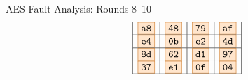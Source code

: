 \documentclass{beamer}
\newenvironment{tres important}[2][]{
	\setkeys{EmphEqEnv}{#2}
	\setkeys{EmphEqOpt}{box={\setlength{\fboxsep}{10pt}\fcolorbox{myNewColorA}{white}},#1}
	\EmphEqMainEnv}
{\endEmphEqMainEnv}
\begin{document}
\begin{frame}[fragile]{AES Fault Analysis: Rounds 8–10}
\[\begin{array}{ccc}
    &

\begin{array}{|c|c|c|c|}
    \hline
    \fcolorbox{orange!80!black}{orange!20}{\texttt{a8}} & \fcolorbox{orange!80!black}{orange!20}{\texttt{48}} & \fcolorbox{orange!80!black}{orange!20}{\texttt{79}} & \fcolorbox{orange!80!black}{orange!20}{\texttt{af}} \\
    \hline
    \fcolorbox{orange!80!black}{orange!20}{\texttt{e4}} & \fcolorbox{orange!80!black}{orange!20}{\texttt{0b}} & \fcolorbox{orange!80!black}{orange!20}{\texttt{e2}} & \fcolorbox{orange!80!black}{orange!20}{\texttt{4d}} \\
    \hline
    \fcolorbox{orange!80!black}{orange!20}{\texttt{8d}} & \fcolorbox{orange!80!black}{orange!20}{\texttt{62}} & \fcolorbox{orange!80!black}{orange!20}{\texttt{d1}} & \fcolorbox{orange!80!black}{orange!20}{\texttt{97}} \\
    \hline
    \fcolorbox{orange!80!black}{orange!20}{\texttt{37}} & \fcolorbox{orange!80!black}{orange!20}{\texttt{e1}} & \fcolorbox{orange!80!black}{orange!20}{\texttt{0f}} & \fcolorbox{orange!80!black}{orange!20}{\texttt{04}} \\
    \hline
    \end{array}
\end{array}
\]
\end{frame}
\end{document}
